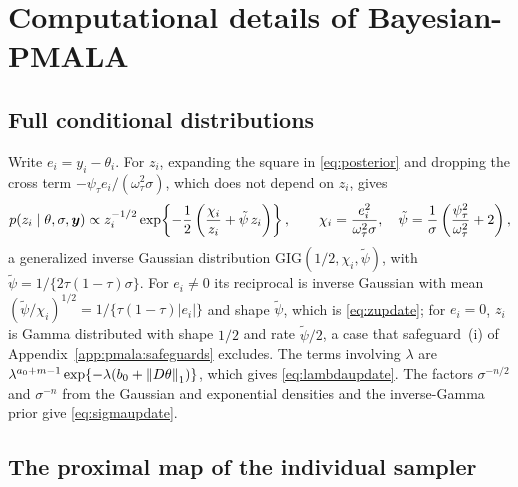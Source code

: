\section{Computational details of Bayesian-PMALA}
\label{app:pmala}

\subsection{Full conditional distributions}
\label{app:pmala:conditionals}

Write $e_i = y_i - \theta_i$. For $z_i$, expanding the square in \eqref{eq:posterior} and dropping the cross term $-\psi_\tau e_i/(\omega_\tau^2\sigma)$, which does not depend on $z_i$, gives
\[
p(z_i \mid \theta, \sigma, \bm{y}) \propto z_i^{-1/2} \exp\!\left\{-\frac{1}{2}\left(\frac{\chi_i}{z_i} + \tilde\psi\, z_i\right)\right\},
\qquad \chi_i = \frac{e_i^2}{\omega_\tau^2 \sigma}, \quad \tilde\psi = \frac{1}{\sigma}\left(\frac{\psi_\tau^2}{\omega_\tau^2} + 2\right),
\]
a generalized inverse Gaussian distribution $\mathrm{GIG}(1/2, \chi_i, \tilde\psi)$, with $\tilde\psi = 1/\{2\tau(1-\tau)\sigma\}$. For $e_i \ne 0$ its reciprocal is inverse Gaussian with mean $(\tilde\psi/\chi_i)^{1/2} = 1/\{\tau(1-\tau)|e_i|\}$ and shape $\tilde\psi$, which is \eqref{eq:zupdate}; for $e_i = 0$, $z_i$ is Gamma distributed with shape $1/2$ and rate $\tilde\psi/2$, a case that safeguard~(i) of Appendix~\ref{app:pmala:safeguards} excludes. The terms involving $\lambda$ are $\lambda^{a_0+m-1}\exp\{-\lambda(b_0 + \left\lVert D\theta\right\rVert_1)\}$, which gives \eqref{eq:lambdaupdate}. The factors $\sigma^{-n/2}$ and $\sigma^{-n}$ from the Gaussian and exponential densities and the inverse-Gamma prior give \eqref{eq:sigmaupdate}.

\subsection{The proximal map of the individual sampler}
\label{app:pmala:admm}

